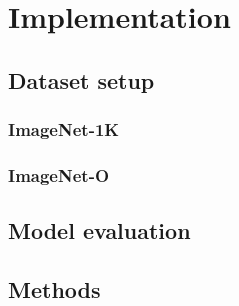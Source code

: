 \chapter{Implementation}
\label{chapt:Implementation}

\section{Dataset setup}
\subsection{ImageNet-1K}
\subsection{ImageNet-O}

\section{Model evaluation}

\section{Methods}
